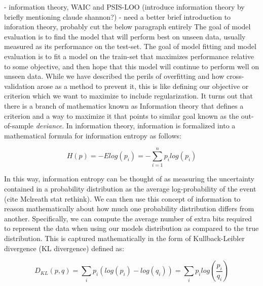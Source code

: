 - information theory, WAIC and PSIS-LOO
(introduce information theory by briefly mentioning claude shannon?)
- need a better brief introduction to inforation theory, probably cut the below paragraph entirely
The goal of model evaluation is to find the model that will perform best on unseen data, usually measured as its performance on the test-set.
The goal of model fitting and model evaluation is to fit a model on the train-set that maximizes performance relative to some objective, and then hope that this model will continue to perform well on unseen data. While we have described the perils of overfitting and how cross-validation arose as a method to prevent it, this is like defining our objective or criterion which we want to maximize to include regularization. It turns out that there is a branch of mathematics known as Information theory that defines a criterion and a way to maximize it that points to similar goal known as the out-of-sample \textit{deviance}. In information theory, information is formalized into a mathematical formula for information entropy as follows:

\begin{equation}
H(p) = -Elog(p_i) = - \sum_{i=1}^{n} p_i log(p_i)
\end{equation}

In this way, information entropy can be thought of as measuring the uncertainty contained in a probability distribution as the average log-probability of the event (cite Mclreath stat rethink). We can then use this concept of information to reason mathematically about how much one probability distribution differs from another. Specifically, we can compute the average number of extra bits required to represent the data when using our models distribution as compared to the true distribution. This is captured mathematically in the form of Kullback-Leibler divergence (KL divergence) defined as:

\begin{equation}
D_{KL}(p,q) = \sum_{i} p_i (log(p_i) - log(q_i)) = \sum_{i} p_i log \left(\frac{p_i}{q_i} \right)
\end{equation}

